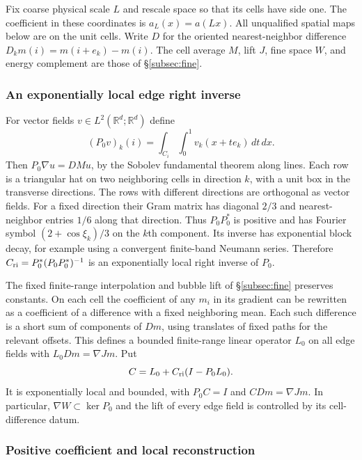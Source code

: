 \documentclass[11pt]{article}
\begin{document}
Fix coarse physical scale \(L\) and rescale space so that its cells have side one. The coefficient in these coordinates is \(a_L(x)=a(Lx)\). All unqualified spatial maps below are on the unit cells. Write \(D\) for the oriented nearest-neighbor difference \(D_k m(i)=m(i+e_k)-m(i)\). The cell average \(M\), lift \(J\), fine space \(W\), and energy complement are those of \S\ref{subsec:fine}.

\subsubsection{An exponentially local edge right inverse}\label{an-exponentially-local-edge-right-inverse}

For vector fields \(v\in L^2(\mathbb R^d;\mathbb R^d)\) define \[
(P_0 v)_k(i)=\int_{C_i}\int_0^1 v_k(x+t e_k)\,dt\,dx .
\] Then \(P_0\nabla u=DMu\), by the Sobolev fundamental theorem along lines. Each row is a triangular hat on two neighboring cells in direction \(k\), with a unit box in the transverse directions. The rows with different directions are orthogonal as vector fields. For a fixed direction their Gram matrix has diagonal \(2/3\) and nearest-neighbor entries \(1/6\) along that direction. Thus \(P_0P_0^*\) is positive and has Fourier symbol \((2+\cos\xi_k)/3\) on the \(k\)th component. Its inverse has exponential block decay, for example using a convergent finite-band Neumann series. Therefore \(C_{\rm ri}=P_0^*(P_0P_0^*)^{-1}\) is an exponentially local right inverse of \(P_0\).

The fixed finite-range interpolation and bubble lift of \S\ref{subsec:fine} preserves constants. On each cell the coefficient of any \(m_i\) in its gradient can be rewritten as a coefficient of a difference with a fixed neighboring mean. Each such difference is a short sum of components of \(Dm\), using translates of fixed paths for the relevant offsets. This defines a bounded finite-range linear operator \(L_0\) on all edge fields with \(L_0Dm=\nabla Jm\). Put \[
C=L_0+C_{\rm ri}(I-P_0 L_0).
\] It is exponentially local and bounded, with \(P_0C=I\) and \(CDm=\nabla Jm\). In particular, \(\nabla W\subset\ker P_0\) and the lift of every edge field is controlled by its cell-difference datum.

\subsubsection{Positive coefficient and local reconstruction}\label{positive-coefficient-and-local-reconstruction}
\end{document}
